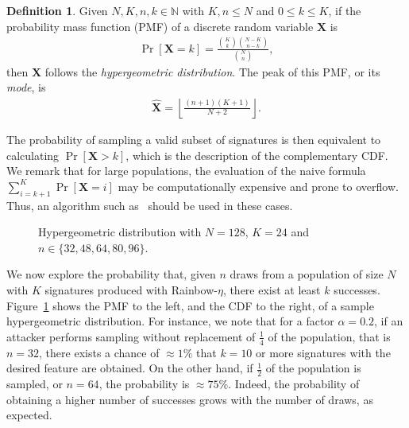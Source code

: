 \documentclass[12pt, a4paper, oneside]{memoir}
\theoremstyle{definition}
\newtheorem{definition}[theorem]{Definition}
\begin{document}
\begin{definition}
  Given $N, K, n, k \in \mathbb{N}$ with $K, n \leq N$ and $0 \leq k \leq K$, if the probability mass function (PMF) of a discrete random variable $\mathbf{X}$ is
  \begin{align}
    \Pr[\mathbf{X} = k] = \frac{\binom{K}{k}\binom{N - K}{n - k}}{\binom{N}{n}},
  \end{align}
  then $\mathbf{X}$ follows the \emph{hypergeometric distribution}. The peak of this PMF, or its \emph{mode}, is
  \begin{align}
    \hat{\mathbf{X}} = \left\lfloor \frac{(n + 1)(K + 1)}{N + 2} \right\rfloor.
  \end{align}
\end{definition}

The probability of sampling a valid subset of signatures is then equivalent to calculating $\Pr[\mathbf{X} > k]$, which is the description of the complementary CDF. We remark that for large populations, the evaluation of the naive formula $\sum_{i = k + 1}^{K} \Pr[\mathbf{X} = i]$ may be computationally expensive and prone to overflow. Thus, an algorithm such as~\cite{Berkopec:200607} should be used in these cases.

\begin{figure}[htbp]
  \caption{Hypergeometric distribution with
    $N = 128$, $K = 24$ and $n \in \{32, 48, 64, 80, 96\}$.}\label{fig:hyper}
\end{figure}

We now explore the probability that, given $n$ draws from a population of size $N$ with $K$ signatures produced with Rainbow-$\eta$, there exist at least $k$ successes. Figure~\ref{fig:hyper} shows the PMF to the left, and the CDF to the right, of a sample hypergeometric distribution. For instance, we note that for a factor $\alpha = 0.2$, if an attacker performs sampling without replacement of $\frac{1}{4}$ of the population, that is $n = 32$, there exists a chance of $\approx 1\%$ that $k = 10$ or more signatures with the desired feature are obtained. On the other hand, if $\frac{1}{2}$ of the population is sampled, or $n = 64$, the probability is $\approx 75\%$. Indeed, the probability of obtaining a higher number of successes grows with the number of draws, as expected.
\end{document}
